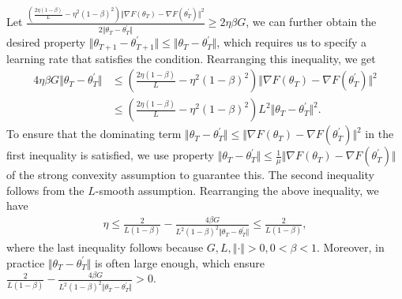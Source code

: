 Let $\frac{\left(\frac{2\eta (1-\beta)}{L} -\eta^2(1-\beta)^2 \right) \Vert \nabla F(\theta_{T}) -\nabla F(\theta_{T}^{\prime})\Vert^2}{2\Vert \theta_T- \theta_T^{\prime}\Vert} \geq  2\eta\beta G$, we can further obtain the desired property $\Vert \theta_{T+1} - \theta_{T+1}^{\prime}\Vert \leq \Vert \theta_T- \theta_T^{\prime}\Vert$, which requires us to specify a learning rate that satisfies the condition. Rearranging this inequality, we get
\begin{equation}
\begin{aligned}
4\eta \beta G \Vert \theta_T - \theta_T^{\prime}\Vert &\leq (\frac{2\eta (1-\beta)}{L} - \eta^2(1-\beta)^2)\Vert \nabla F(\theta_T) - \nabla F(\theta_T^{\prime})\Vert^2 \\
& \leq (\frac{2\eta (1-\beta)}{L} - \eta^2(1-\beta)^2)L^2\Vert \theta_T - \theta_T^{\prime}\Vert^2.
\end{aligned}
\end{equation}
To ensure that the dominating term $\Vert \theta_T - \theta_T^{\prime}\Vert \leq \Vert \nabla F(\theta_T) - \nabla F(\theta_T^{\prime})\Vert^2$ in the first inequality is satisfied, we use property $\Vert \theta_T - \theta_T^{\prime}\Vert \leq \frac{1}{\mu}\Vert \nabla F(\theta_T) - \nabla F(\theta_T^{\prime})\Vert$ of the strong convexity assumption to guarantee this. The second inequality follows from the $L$-smooth assumption. Rearranging the above inequality, we have 
\begin{equation}
\begin{aligned}
\eta\leq\frac{2}{L(1-\beta)}-\frac{4\beta G}{L^2(1-\beta)^2\Vert \theta_T - \theta_T^{\prime}\Vert}\leq\frac{2}{L(1-\beta)},
\end{aligned}
\end{equation}
where the last inequality follows because $G,L,\Vert\cdot\Vert >0,0<\beta<1$. Moreover, in practice $\Vert \theta_T - \theta_T^{\prime}\Vert$ is often large enough, which ensure $\frac{2}{L(1-\beta)} - \frac{4\beta G}{L^2(1-\beta)^2\Vert \theta_T - \theta_T^{\prime}\Vert}>0$.

